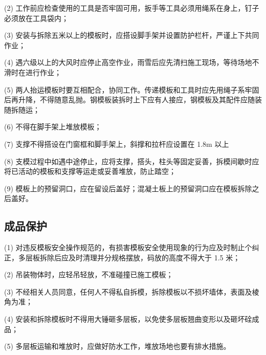 (2) 工作前应检查使用的工具是否牢固可用，扳手等工具必须用绳系在身上，钉子必须放在工具袋内；

(3) 安装与拆除五米以上的模板时，应搭设脚手架并设置防护栏杆，严谨上下共同作业；

(4) 遇六级以上的大风时应停止高空作业，雨雪后应先清扫施工现场，等待场地不滑时在进行作业；

(5) 两人抬运模板时要互相配合，协同工作。传递模板和工具时应先用绳子系牢固后再升降，不得随意乱抛。钢模板装拆时上下应有人接应，钢模板及其配件应随装随拆随运；

(6) 不得在脚手架上堆放模板；

(7) 支撑不得搭设在门窗框和脚手架上，斜撑和拉杆应设置在 1.8m 以上

(8) 支模过程中如遇中途停止，应将支撑，搭头，柱头等固定妥善，拆模间歇时应将已活动的模板和支撑等运走或妥善堆放，防止踏空；

(9) 模板上的预留洞口，应在留设后盖好；混凝土板上的预留洞口应在模板拆除之后盖好。

\subsection{成品保护}

(1) 对违反模板安全操作规范的，有损害模板安全使用现象的行为应及时制止个纠正，多层板拆除后应及时清理并分规格摆放，码放的高度不得大于 1.5 米；

(2) 吊装物体时，应轻吊轻放，不准碰撞已施工模板；

(3) 不经相关人员同意，任何人不得私自拆模，拆除模板以不损坏墙体，表面及棱角为准；

(4) 安装和拆除模板时不得用大锤砸多层板，以免使多层板翘曲变形以及砸坏硂成品；

(5) 多层板运输和堆放时，应做好防水工作，堆放场地也要有排水措施。

